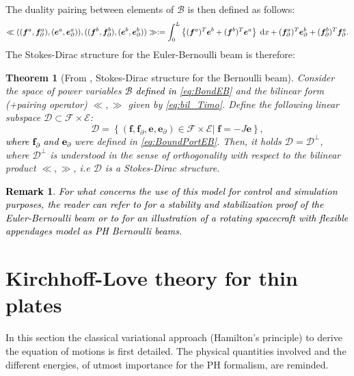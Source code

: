 \documentclass[11pt]{article}
\newtheorem{theorem}{Theorem}
\newtheorem{remark}{Remark}
\newcommand{\revOne}[1]{\textcolor{black}{#1}}
\begin{document}
	The duality pairing between elements of $\mathcal{B}$ is then defined as follows:
	\begin{equation}
	\label{eq:bil_Timo}
	\ll ((\bm{f}^a,\bm{f}_{\partial}^a), (\bm{e}^a,\bm{e}_{\partial}^a)), ((\bm{f}^b,\bm{f}_{\partial}^b), (\bm{e}^b,\bm{e}_{\partial}^b)) \gg := \int_{0}^{L}\left\{ (\bm{f}^{a})^T \bm{e}^b + (\bm{f}^{b})^T \bm{e}^a \right\} \d{x} + (\bm{f}_{\partial}^{a})^T \bm{e}_{\partial}^b + (\bm{f}_{\partial}^{b}) ^T \bm{f}_{\partial}^a.
	\end{equation}
	The Stokes-Dirac structure for the Euler-Bernoulli beam is therefore:
	\begin{theorem}[From \cite{LeGorrec2005}, Stokes-Dirac structure for the Bernoulli beam]
		Consider the space of power variables \revOne{$\mathcal{B}$ defined in \eqref{eq:BondEB}} and the bilinear form (+pairing operator) $\ll , \gg$ given by \eqref{eq:bil_Timo}. Define the following linear subspace $\mathcal{D} \subset \mathcal{F} \times \mathcal{E}$:
		\begin{equation}
		\mathcal{D} =  \left\{(\bm{f},\bm{f}_{\partial},\bm{e},\bm{e}_{\partial}) \in \mathcal{F} \times \mathcal{E} | \; \bm{f} = -J\bm{e} \right\},
		\end{equation}
		\revOne{where $\bm{f}_{\partial}$ and $\bm{e}_{\partial}$} were defined in \eqref{eq:BoundPortEB}. Then, it holds $\mathcal{D} = \mathcal{D}^{\perp}$, where $\mathcal{D}^{\perp}$ is understood in the sense of orthogonality with respect to the bilinear product $\ll , \gg$,  i.e $\mathcal{D}$ is a Stokes-Dirac structure. 
	\end{theorem}
	\revOne{
		\begin{remark}
			For what concerns the use of this model for control and simulation purposes, the reader can refer to \cite{stabBeam} for a stability and stabilization proof of the Euler-Bernoulli beam or to \cite{aoues:hal-01738092} for an illustration of a rotating spacecraft with flexible appendages model as PH Bernoulli beams.
		\end{remark}
	}
	\section{Kirchhoff-Love theory for thin plates}
	In this section the classical variational approach (Hamilton's principle) to derive the equation of motions is first detailed. The physical quantities involved and the different energies, of utmost importance for the PH formalism, are reminded.
	
	
\end{document}
